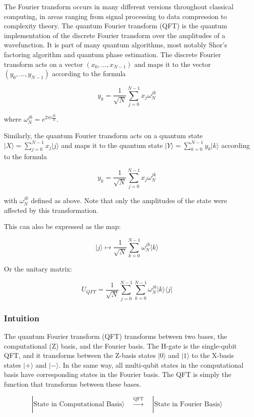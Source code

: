 \documentclass{article}
\begin{document}
The Fourier transform occurs in many different versions throughout classical computing, in areas ranging from signal processing to data compression to complexity theory. The quantum Fourier transform (QFT) is the quantum implementation of the discrete Fourier transform over the amplitudes of a wavefunction. It is part of many quantum algorithms, most notably Shor's factoring algorithm and quantum phase estimation. The discrete Fourier transform acts on a vector \((x_0, ..., x_{N-1})\) and maps it to the vector \((y_0, ..., y_{N-1})\) according to the formula

\[y_k = \frac{1}{\sqrt{N}}\sum_{j=0}^{N-1}x_j\omega_N^{jk}\]

where \(\omega_N^{jk} = e^{2\pi i \frac{jk}{N}}\).

Similarly, the quantum Fourier transform acts on a quantum state \(\vert X\rangle = \sum_{j=0}^{N-1} x_j \vert j \rangle\) and maps it to the quantum state \(\vert Y\rangle = \sum_{k=0}^{N-1} y_k \vert k \rangle\) according to the formula

\[y_k = \frac{1}{\sqrt{N}}\sum_{j=0}^{N-1}x_j\omega_N^{jk}\]

with \(\omega_N^{jk}\) defined as above. Note that only the amplitudes
of the state were affected by this transformation.

This can also be expressed as the map:

\[\vert j \rangle \mapsto \frac{1}{\sqrt{N}}\sum_{k=0}^{N-1}\omega_N^{jk} \vert k \rangle\]

Or the unitary matrix:

\[ U_{QFT} = \frac{1}{\sqrt{N}} \sum_{j=0}^{N-1} \sum_{k=0}^{N-1} \omega_N^{jk} \vert k \rangle \langle j \vert\]

\hypertarget{intuition}{%
\subsubsection{\texorpdfstring{Intuition}{}}\label{intuition}}

The quantum Fourier transform (QFT) transforms between two bases, the
computational (Z) basis, and the Fourier basis. The H-gate is the
single-qubit QFT, and it transforms between the Z-basis states
\(|0\rangle\) and \(|1\rangle\) to the X-basis states \(|{+}\rangle\)
and \(|{-}\rangle\). In the same way, all multi-qubit states in the
computational basis have corresponding states in the Fourier basis. The
QFT is simply the function that transforms between these bases.

\[
|\text{State in Computational Basis}\rangle \quad \xrightarrow[]{\text{QFT}} \quad |\text{State in Fourier Basis}\rangle
\]
\end{document}
